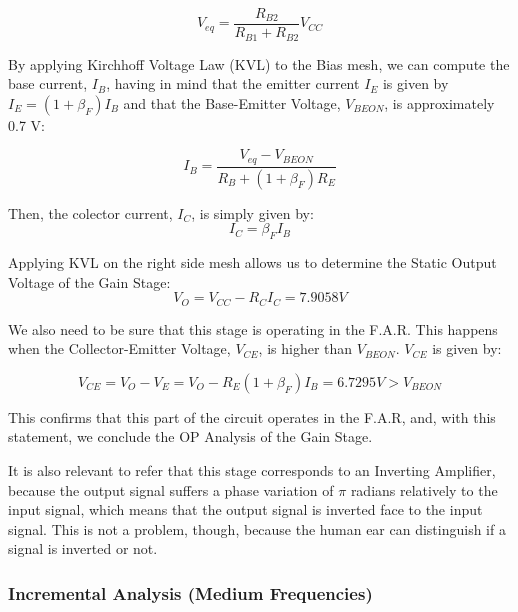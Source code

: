 \begin{equation}
	V_{eq} = \frac{R_{B2}}{R_{B1} + R_{B2}} V_{CC}
	\label{eq:VTh}
\end{equation}

By applying Kirchhoff Voltage Law (KVL) to the Bias mesh, we can compute the base current, $I_B$, having in mind that the emitter current $I_E$ is given by $I_E = (1 + \beta_F)I_B$ and that the Base-Emitter Voltage, $V_{BEON}$, is approximately 0.7 V:

\begin{equation}
	I_B = \frac{V_{eq} - V_{BEON}}{R_B + (1 + \beta_F)R_E}
	\label{eq:IbGain}
\end{equation}

Then, the colector current, $I_C$, is simply given by:
\begin{equation}
	I_C = \beta_FI_B
	\label{eq:IcGain}
\end{equation}

Applying KVL on the right side mesh allows us to determine the Static Output Voltage of the Gain Stage:
\begin{equation}
	V_O = V_{CC} -R_CI_C = 7.9058 V
	\label{eq:VoGain}
\end{equation}

We also need to be sure that this stage is operating in the F.A.R. This happens when the Collector-Emitter Voltage, $V_{CE}$, is higher than $V_{BEON}$. $V_{CE}$ is given by:

\begin{equation}
	V_{CE} = V_O - V_E = V_O - R_E (1 + \beta_F)I_B =  6.7295 V > V_{BEON}
\end{equation}

This confirms that this part of the circuit operates in the F.A.R, and, with this statement, we conclude the OP Analysis of the Gain Stage.

It is also relevant to refer that this stage corresponds to an Inverting Amplifier, because the output signal suffers a phase variation of $\pi$ radians relatively to the input signal, which means that the output signal is inverted face to the input signal. This is not a problem, though, because the human ear can distinguish if a signal is inverted or not.


\subsubsection{Incremental Analysis (Medium Frequencies)}

